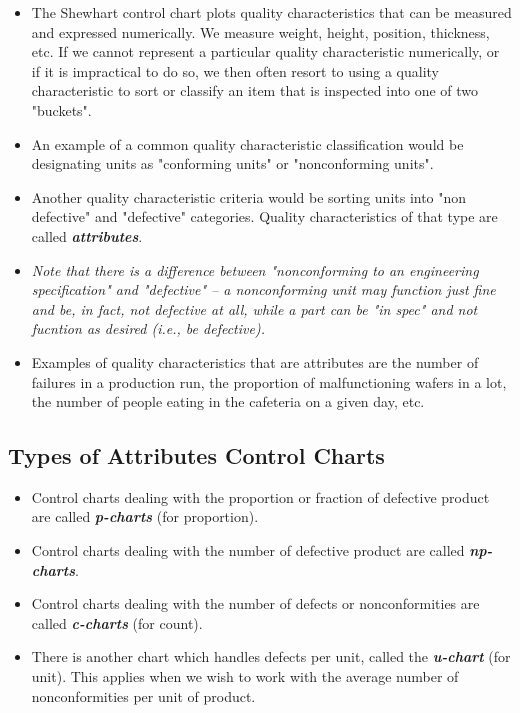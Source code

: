 \documentclass[]{report}
\begin{document}
\begin{itemize}
	\item The Shewhart control chart plots quality characteristics that can be measured and expressed numerically. We measure weight, height, position, thickness, etc. If we cannot represent a particular quality characteristic numerically, or if it is impractical to do so, we then often resort to using a quality characteristic to sort or classify an item that is inspected into one of two "buckets".
	\item  An example of a common quality characteristic classification would be designating units as "conforming units" or "nonconforming units". 
	\item Another quality characteristic criteria would be sorting units into "non defective" and "defective" categories. Quality characteristics of that type are called \textit{\textbf{attributes}}.
	
	\item \textit{Note that there is a difference between "nonconforming to an engineering specification" and "defective" -- a nonconforming unit may function just fine and be, in fact, not defective at all, while a part can be "in spec" and not fucntion as desired (i.e., be defective).}
	
	\item Examples of quality characteristics that are attributes are the number of failures in a production run, the proportion of malfunctioning wafers in a lot, the number of people eating in the cafeteria on a given day, etc.
\end{itemize}
\subsection{Types of Attributes Control Charts}

\begin{itemize}
	\item Control charts dealing with the proportion or fraction of defective product are called  \textbf{\textit{p-charts}} (for proportion).
	\item Control charts dealing with the number of defective product are called  \textbf{\textit{np-charts}}.
	\item Control charts dealing with the number of defects or nonconformities are called \textbf{\textit{c-charts}} (for count).
	\item There is another chart which handles defects per unit, called the \textbf{\textit{u-chart}} (for unit). This applies when we wish to work with the average number of nonconformities per unit of product.
\end{itemize}
\end{document}
